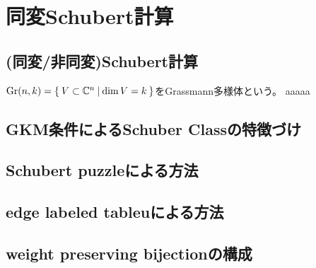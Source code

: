 \section{同変Schubert計算}
\subsection{(同変/非同変)Schubert計算}
$\text{Gr}(n, k)=\left\{\:V\subset \mathbb{C}^n\:\middle|\:\dim V = k\:\right\}$をGrassmann多様体という。
aaaaa

\subsection{GKM条件によるSchuber Classの特徴づけ}

\subsection{Schubert puzzleによる方法}

\subsection{edge labeled tableuによる方法}

\subsection{weight preserving bijectionの構成}